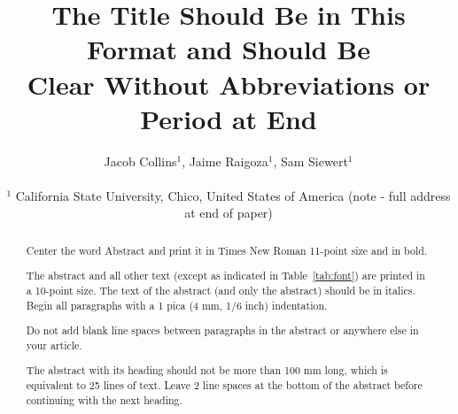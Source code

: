 \documentclass[twocolumn]{cinc}
\begin{document}


\title{The Title Should Be in This Format and Should Be \\
Clear Without Abbreviations or Period at End}


\author {Jacob Collins$^{1}$, Jaime Raigoza$^{1}$, Sam Siewert$^{1}$ \\
\ \\ %
 $^1$ California State University, Chico, United States of America (note - full address at end of paper)}

\maketitle

\begin{abstract}

    Center the word Abstract and print it in Times New Roman 11-point size
    and in bold.

% 
% 
    The abstract and all other text (except as indicated in
    Table~\ref{tab:font}) are printed in a 10-point size. The text of the
    abstract (and only the abstract) should be in italics. Begin all
    paragraphs with a 1 pica (4 mm, 1/6 inch) indentation.

    Do not add blank line spaces between paragraphs in the abstract or
    anywhere else in your article.

    The abstract with its heading should not be more than 100 mm long,
    which is equivalent to 25 lines of text. Leave 2 line spaces at the
    bottom of the abstract before continuing with the next heading.

\end{abstract}
\end{document}
